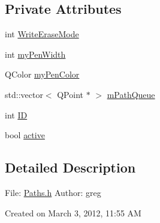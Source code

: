 \subsection*{Private Attributes}
\begin{DoxyCompactItemize}
\item 
int \hyperlink{classPaths_ad26ddb9106389428f3ba4cd0cd7eb77a}{WriteEraseMode}
\item 
int \hyperlink{classPaths_a8ed757e23d6850088af1fb98f50f9f92}{myPenWidth}
\item 
QColor \hyperlink{classPaths_a60780e00c7dfd69bf1e8db95217ee77e}{myPenColor}
\item 
std::vector$<$ QPoint $\ast$ $>$ \hyperlink{classPaths_a53a3768ea7270f0fab3d9838db3ff327}{mPathQueue}
\item 
int \hyperlink{classPaths_a54282ab5ada2fefcd9344d28e73db4c1}{ID}
\item 
bool \hyperlink{classPaths_aa3333ae27bae8f24a2ef84812371e655}{active}
\end{DoxyCompactItemize}


\subsection{Detailed Description}
File: \hyperlink{Paths_8h}{Paths.h} Author: greg

Created on March 3, 2012, 11:55 AM 

